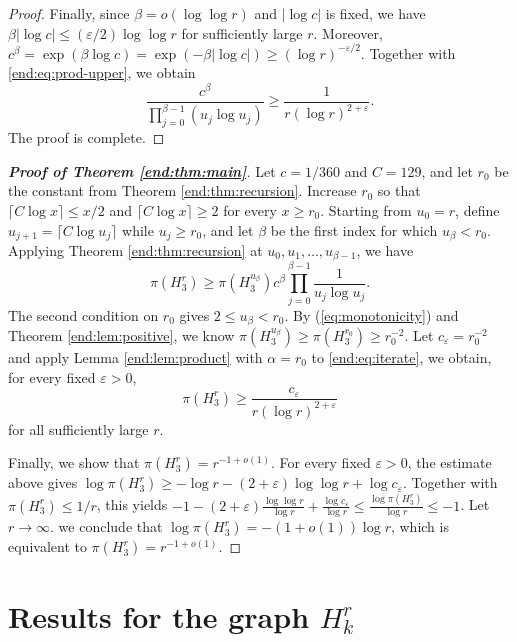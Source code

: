 \documentclass[12pt,a4paper]{article}
\numberwithin{equation}{section}
\theoremstyle{definition}
\theoremstyle{remark}
\begin{document}
\begin{proof}
Finally, since $\beta=o(\log\log r)$ and $|\log c|$ is fixed, we have $\beta|\log c|\le(\varepsilon/2)\log\log r$ for sufficiently large $r$.  
Moreover, $c^\beta=\exp(\beta\log c)=\exp(-\beta|\log c|)\ge(\log r)^{-\varepsilon/2}$.
Together with \eqref{end:eq:prod-upper}, we obtain
$$
 \frac{c^\beta}{\displaystyle\prod_{j=0}^{\beta-1}(u_j\log u_j)}
 \ge\frac{1}{r(\log r)^{2+\varepsilon}}.
$$
The proof is complete.
\end{proof}



\begin{proof}[\bfseries{Proof of Theorem \ref{end:thm:main}}]
Let $c=1/360$ and $C=129$, and let $r_0$ be the constant from Theorem \ref{end:thm:recursion}.  
Increase $r_0$ so that $\lceil C\log x\rceil\le x/2$ and $\lceil C\log x\rceil\ge2$ for every $x\ge r_0$.  
Starting from $u_0=r$, define $u_{j+1}=\lceil C\log u_j\rceil$ while $u_j\ge r_0$, and 
let $\beta$ be the first index for which $u_\beta<r_0$.  
Applying Theorem \ref{end:thm:recursion} at $u_0,u_1,\ldots,u_{\beta-1}$, we have
\begin{equation}\label{end:eq:iterate}
 \pi(H_3^r)
 \ge\pi(H_3^{u_\beta})c^\beta\prod_{j=0}^{\beta-1}\frac1{u_j\log u_j}.
\end{equation}
The second condition on $r_0$ gives $2\le u_\beta<r_0$.  
By  (\ref{eq:monotonicity}) and  Theorem \ref{end:lem:positive}, we know
$\pi (H_3^{u_{\beta}})\ge \pi (H_3^{r_0})\ge r_0^{-2}$.  
Let $c_{\varepsilon}=r_0^{-2}$ and apply Lemma \ref{end:lem:product} with $\alpha=r_0$ to \eqref{end:eq:iterate}, we obtain, for every fixed $\varepsilon>0$,
$$ \pi(H_3^r)\ge\frac{c_{\varepsilon}}{r(\log r)^{2+\varepsilon}}$$
for all sufficiently large $r$.

Finally, we  show that $\pi(H_3^r)=r^{-1+o(1)}$.
For every fixed $\varepsilon>0$, the estimate above gives $\log\pi(H_3^r)\ge-\log r-(2+\varepsilon)\log\log r+\log c_\varepsilon$.  Together with $\pi(H_3^r)\le1/r$, this yields
$-1-(2+\varepsilon)\frac{\log\log r}{\log r}+\frac{\log c_\varepsilon}{\log r}\le\frac{\log\pi(H_3^r)}{\log r}\le-1$.  
Let $r\to\infty$. we conclude that $\log\pi(H_3^r)=-(1+o(1))\log r$, 
which is equivalent to $\pi(H_3^r)=r^{-1+o(1)}$.
\end{proof}

\section{Results for the graph \texorpdfstring{$H_k^r$}{Hkr}}\label{sec:3}
\end{document}
